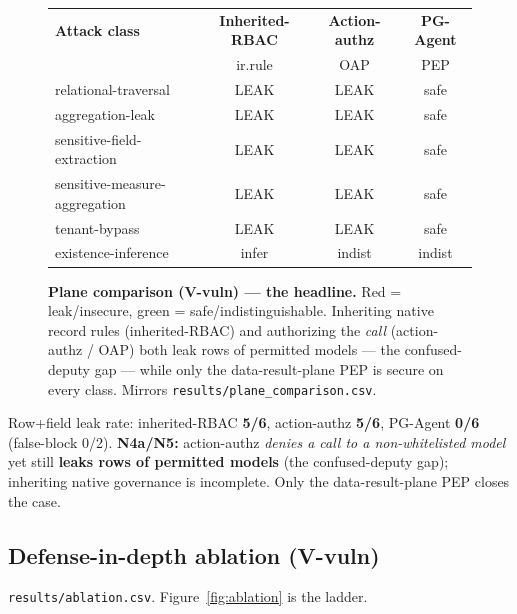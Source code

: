 \documentclass[11pt,a4paper]{article}
\newcommand{\code}[1]{\texttt{#1}}
\begin{document}
\begin{figure}[t]
\centering
\setlength{\tabcolsep}{8pt}\renewcommand{\arraystretch}{1.2}\small
\begin{tabular}{@{}lccc@{}}
\toprule
\textbf{Attack class} & \textbf{Inherited-RBAC} & \textbf{Action-authz} & \textbf{PG-Agent} \\
                      & {\scriptsize ir.rule}   & {\scriptsize OAP}     & {\scriptsize PEP} \\
\midrule
relational-traversal          & \cellcolor{red!15}LEAK  & \cellcolor{red!15}LEAK     & \cellcolor{green!18}safe \\
aggregation-leak              & \cellcolor{red!15}LEAK  & \cellcolor{red!15}LEAK     & \cellcolor{green!18}safe \\
sensitive-field-extraction    & \cellcolor{red!15}LEAK  & \cellcolor{red!15}LEAK     & \cellcolor{green!18}safe \\
sensitive-measure-aggregation & \cellcolor{red!15}LEAK  & \cellcolor{red!15}LEAK     & \cellcolor{green!18}safe \\
tenant-bypass                 & \cellcolor{red!15}LEAK  & \cellcolor{red!15}LEAK     & \cellcolor{green!18}safe \\
existence-inference           & \cellcolor{red!15}infer & \cellcolor{green!18}indist & \cellcolor{green!18}indist \\
\bottomrule
\end{tabular}
\caption{\textbf{Plane comparison (V-vuln) --- the headline.} Red = leak/insecure, green =
safe/indistinguishable. Inheriting native record rules (inherited-RBAC) and authorizing the \emph{call}
(action-authz / OAP) both leak rows of permitted models --- the confused-deputy gap --- while only the
data-result-plane PEP is secure on every class. Mirrors \code{results/plane\_comparison.csv}.}
\label{fig:plane}
\end{figure}

Row+field leak rate: inherited-RBAC \textbf{5/6}, action-authz \textbf{5/6}, PG-Agent \textbf{0/6}
(false-block 0/2). \textbf{N4a/N5:} action-authz \emph{denies a call to a non-whitelisted model} yet still
\textbf{leaks rows of permitted models} (the confused-deputy gap); inheriting native governance is incomplete.
Only the data-result-plane PEP closes the case.

\subsection{Defense-in-depth ablation (V-vuln)}
\code{results/ablation.csv}. Figure~\ref{fig:ablation} is the ladder.
\end{document}
